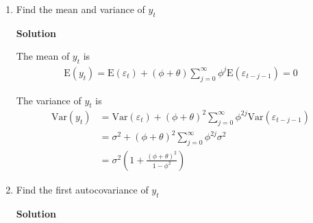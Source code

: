 \documentclass[12pt]{article}
\begin{document}
\begin{enumerate}
    \item Find the mean and variance of $ y_{t} $

          \textbf{Solution}

          The mean of $ y_{t} $ is
          \begin{align*}
              \mathrm{E} (y_{t}) = \mathrm{E} (\varepsilon_{t}) + \left( \phi + \theta \right) \sum_{j=0}^{\infty} \phi^{j} \mathrm{E} (\varepsilon_{t-j-1}) = 0
          \end{align*}

          The variance of $ y_{t} $ is
          \begin{align*}
              \mathrm{Var} (y_{t}) & = \mathrm{Var} (\varepsilon_{t}) + \left( \phi + \theta \right)^2 \sum_{j=0}^{\infty} \phi^{2j} \mathrm{Var} (\varepsilon_{t-j-1}) \\
                                   & = \sigma^2 + \left( \phi + \theta \right)^2 \sum_{j=0}^{\infty} \phi^{2j} \sigma^2                                                 \\
                                   & = \sigma^2 \left( 1 + \frac{\left( \phi+\theta \right)^2}{1 - \phi^2} \right)
          \end{align*}

    \item Find the first autocovariance of $ y_{t} $

          \textbf{Solution}


\end{enumerate}
\end{document}

